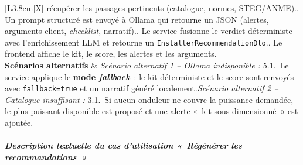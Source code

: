 \begin{table}[H]
\begin{tabularx}{\textwidth}{|L{3.8cm}|X|}
       récupérer les passages pertinents (catalogue, normes, STEG/ANME).. Un prompt structuré est envoyé à Ollama qui retourne un JSON
       (alertes, arguments client, \textit{checklist}, narratif).. Le service fusionne le verdict déterministe avec l'enrichissement LLM
       et retourne un \texttt{InstallerRecommendationDto}.. Le frontend affiche le kit, le score, les alertes et les arguments. \\
    \hline
    \textbf{Scénarios alternatifs} &
    \textit{Scénario alternatif 1 -- Ollama indisponible :}\newline
    \hspace*{6pt}5.1.~Le service applique le \textbf{mode \textit{fallback}}~:
      le kit déterministe et le score sont renvoyés avec
      \texttt{fallback=true} et un narratif généré localement.\newline[2pt]
    \textit{Scénario alternatif 2 -- Catalogue insuffisant :}\newline
    \hspace*{6pt}3.1.~Si aucun onduleur ne couvre la puissance demandée,
      le plus puissant disponible est proposé et une alerte
      «~kit sous-dimensionné~» est ajoutée. \\
    \hline
  \end{tabularx}
\end{table}

\subparagraph{Description textuelle du cas d'utilisation «~Régénérer les recommandations~»}

